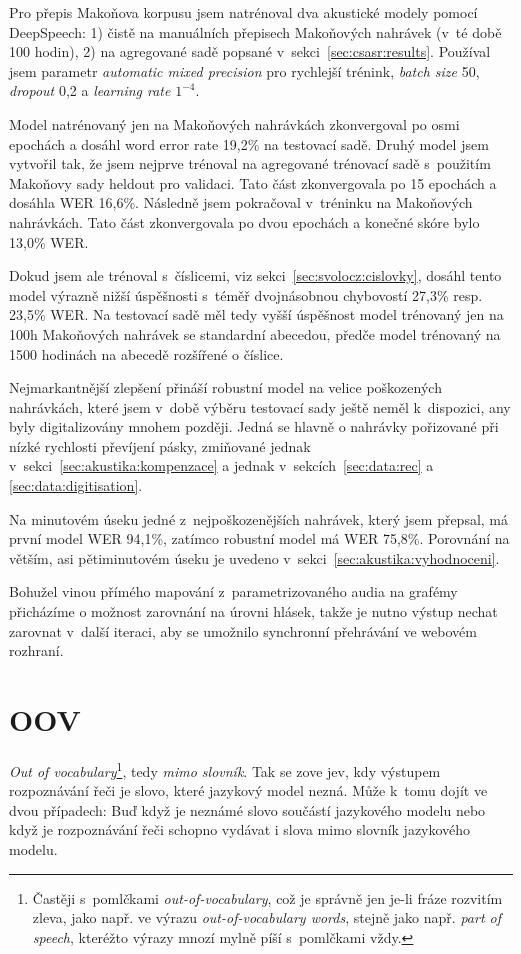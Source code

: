 Pro přepis Makoňova korpusu jsem natrénoval dva akustické modely pomocí DeepSpeech:
1) čistě na manuálních přepisech
Makoňových nahrávek (v~té době 100 hodin), 2) na agregované sadě popsané
v~sekci~\ref{sec:csasr:results}. Používal jsem parametr \textit{automatic mixed
precision} pro rychlejší trénink, \textit{batch size} 50, \textit{dropout} 0,2 a
\textit{learning rate} $1^{-4}$.

Model natrénovaný jen na Makoňových nahrávkách zkonvergoval po osmi epochách a
dosáhl word error rate 19,2\% na testovací sadě. Druhý model jsem vytvořil tak,
že jsem nejprve trénoval na agregované trénovací sadě s~použitím Makoňovy
sady heldout pro validaci. Tato část zkonvergovala po 15 epochách a dosáhla WER
16,6\%. Následně jsem pokračoval v~tréninku na Makoňových nahrávkách. Tato část
zkonvergovala po dvou epochách a konečné skóre bylo 13,0\% WER.

Dokud jsem ale trénoval s~číslicemi, viz sekci~\ref{sec:svolocz:cislovky},
dosáhl tento model výrazně nižší úspěšnosti s~téměř dvojnásobnou chybovostí
27,3\% resp. 23,5\% WER.
Na testovací sadě měl tedy vyšší úspěšnost model trénovaný jen na 100h Makoňových
nahrávek se standardní abecedou, předče model trénovaný na 1500 hodinách na
abecedě rozšířené o číslice.


Nejmarkantnější zlepšení přináší robustní model na velice poškozených nahrávkách, které jsem
v~době výběru testovací sady ještě neměl k~dispozici, any byly digitalizovány
mnohem později. Jedná se hlavně o nahrávky pořizované při nízké rychlosti
převíjení pásky, zmiňované jednak v~sekci~\ref{sec:akustika:kompenzace} a jednak
v~sekcích~\ref{sec:data:rec} a \ref{sec:data:digitisation}.

Na minutovém úseku jedné z~nejpoškozenějších nahrávek, který jsem
přepsal, má první model WER 94,1\%, zatímco robustní model má WER
75,8\%. Porovnání na větším, asi pětiminutovém úseku je uvedeno
v~sekci~\ref{sec:akustika:vyhodnoceni}.

Bohužel vinou přímého mapování z~parametrizovaného audia na grafémy přicházíme o
možnost zarovnání na úrovni hlásek, takže je nutno výstup nechat zarovnat
v~další iteraci, aby se umožnilo synchronní přehrávání ve webovém rozhraní.

\section{OOV}

{\em{}Out of vocabulary}\footnote{Častěji s~pomlčkami {\em out-of-vocabulary},
což je správně jen je-li fráze rozvitím zleva, jako např. ve výrazu {\em
out-of-vocabulary words}, stejně jako např. {\em part of speech}, kteréžto
výrazy mnozí mylně píší s~pomlčkami vždy.}, tedy {\em mimo slovník}. Tak se zove
jev, kdy výstupem rozpoznávání řeči je slovo, které jazykový model nezná. Může
k~tomu dojít ve dvou případech: Buď když je neznámé slovo součástí jazykového
modelu nebo když je rozpoznávání řeči schopno vydávat i slova mimo slovník
jazykového modelu.

